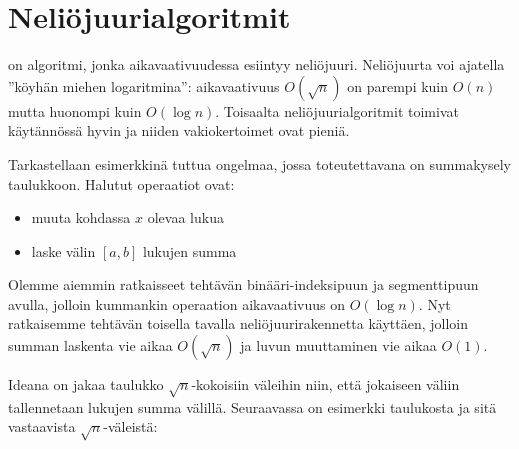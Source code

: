 \chapter{Neliöjuurialgoritmit}


 on algoritmi,
jonka aikavaativuudessa esiintyy neliöjuuri.
Neliöjuurta voi ajatella ''köyhän miehen logaritmina'':
aikavaativuus $O(\sqrt n)$ on parempi kuin $O(n)$
mutta huonompi kuin $O(\log n)$.
Toisaalta neliöjuurialgoritmit toimivat
käytännössä hyvin ja niiden vakiokertoimet ovat pieniä.

Tarkastellaan esimerkkinä tuttua ongelmaa,
jossa toteutettavana on summakysely taulukkoon.
Halutut operaatiot ovat:

\begin{itemize}
\item muuta kohdassa $x$ olevaa lukua
\item laske välin $[a,b]$ lukujen summa
\end{itemize}

Olemme aiemmin ratkaisseet tehtävän
binääri-indeksipuun ja segmenttipuun avulla,
jolloin kummankin operaation aikavaativuus on $O(\log n)$.
Nyt ratkaisemme tehtävän toisella
tavalla neliöjuurirakennetta käyttäen,
jolloin summan laskenta vie aikaa $O(\sqrt n)$
ja luvun muuttaminen vie aikaa $O(1)$.

Ideana on jakaa taulukko $\sqrt n$-kokoisiin
väleihin niin, että jokaiseen väliin
tallennetaan lukujen summa välillä.
Seuraavassa on esimerkki taulukosta ja
sitä vastaavista $\sqrt n$-väleistä:

\begin{center}
\end{center}

